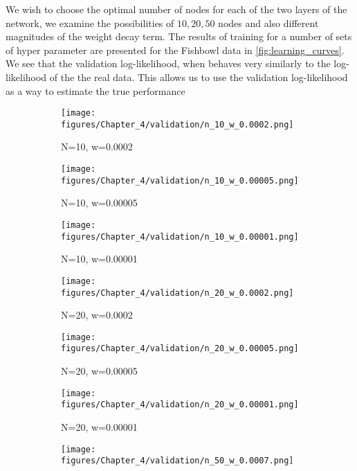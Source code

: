 	We wish to choose the optimal number of nodes for each of the two layers of the network, we examine the possibilities of $10,20,50$
	nodes and also different magnitudes of the weight decay term. The results of training for a number of sets of hyper parameter are presented for the Fishbowl data in \cref{fig:learning_curves}. We see that the validation log-likelihood, when behaves very similarly to the log-likelihood of the the real data. This allows us to use the validation log-likelihood as a way to estimate the true performance
	
	\begin{figure}[h]
		\begin{centering}  
			\begin{subfigure}[b]{0.28\linewidth}
				\texttt{[image: figures/Chapter\_4/validation/n\_10\_w\_0.0002.png]}
				\caption{N=10, w=0.0002}
			\end{subfigure} \hfill
			\begin{subfigure}[b]{0.28\linewidth}
				\texttt{[image: figures/Chapter\_4/validation/n\_10\_w\_0.00005.png]}
				\caption{N=10, w=0.00005}
			\end{subfigure} \hfill 
			\begin{subfigure}[b]{0.28\linewidth}
				\texttt{[image: figures/Chapter\_4/validation/n\_10\_w\_0.00001.png]}
				\caption{N=10, w=0.00001}
			\end{subfigure}
		\end{centering}
		\begin{centering}  
			\begin{subfigure}[b]{0.28\linewidth}
				\texttt{[image: figures/Chapter\_4/validation/n\_20\_w\_0.0002.png]}
				\caption{N=20, w=0.0002}
			\end{subfigure} \hfill
			\begin{subfigure}[b]{0.28\linewidth}
				\texttt{[image: figures/Chapter\_4/validation/n\_20\_w\_0.00005.png]}
				\caption{N=20, w=0.00005}
			\end{subfigure} \hfill 
			\begin{subfigure}[b]{0.28\linewidth}
				\texttt{[image: figures/Chapter\_4/validation/n\_20\_w\_0.00001.png]}
				\caption{N=20, w=0.00001}
			\end{subfigure}
		\end{centering}
		\begin{centering}  
			\begin{subfigure}[b]{0.28\linewidth}
				\texttt{[image: figures/Chapter\_4/validation/n\_50\_w\_0.0007.png]}

\end{subfigure}
\end{centering}
\end{figure}
